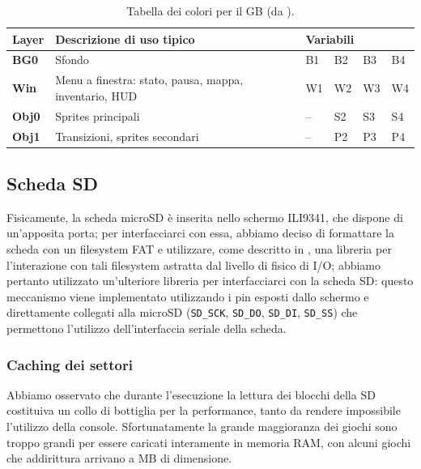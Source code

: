 \documentclass[hidelinks,12pt]{article}
\begin{document}
\begin{table}[h]
	\begin{tabular}{|l|l|llll|}
		\hline
		\textbf{Layer} & \textbf{Descrizione di uso tipico}                    & \multicolumn{4}{l|}{\textbf{Variabili}}                                                          \\ \hline
		\textbf{BG0}   & Sfondo                                                & \multicolumn{1}{l|}{B1}                 & \multicolumn{1}{l|}{B2} & \multicolumn{1}{l|}{B3} & B4 \\ \hline
		\textbf{Win}   & Menu a finestra: stato, pausa, mappa, inventario, HUD & \multicolumn{1}{l|}{W1}                 & \multicolumn{1}{l|}{W2} & \multicolumn{1}{l|}{W3} & W4 \\ \hline
		\textbf{Obj0}  & Sprites principali                                    & \multicolumn{1}{l|}{–}                  & \multicolumn{1}{l|}{S2} & \multicolumn{1}{l|}{S3} & S4 \\ \hline
		\textbf{Obj1}  & Transizioni, sprites secondari                        & \multicolumn{1}{l|}{–}                  & \multicolumn{1}{l|}{P2} & \multicolumn{1}{l|}{P3} & P4 \\ \hline
	\end{tabular}
	\caption{Tabella dei colori per il GB (da
		\cite{GameBoyColors}).}
	\label{table:gb_colors}
\end{table}

\subsection{Scheda SD}
Fisicamente, la scheda microSD è inserita nello schermo ILI9341, che dispone di
un'apposita porta; per interfacciarci con essa, abbiamo deciso di formattare la
scheda con un filesystem FAT e utilizzare, come descritto in \cite{stm1721}, una
libreria per l'interazione con tali filesystem astratta dal livello di fisico di
I/O; abbiamo pertanto utilizzato un'ulteriore libreria per interfacciarci con
la scheda SD: questo meccanismo viene implementato utilizzando i pin esposti
dallo schermo e direttamente collegati alla microSD (\texttt{SD\_SCK},
\texttt{SD\_DO}, \texttt{SD\_DI}, \texttt{SD\_SS}) che permettono l'utilizzo
dell'interfaccia seriale della scheda.

\subsubsection{Caching dei settori}
Abbiamo osservato che durante l'esecuzione la lettura dei blocchi della SD
costituiva un collo di bottiglia per la performance, tanto da rendere
impossibile l'utilizzo della console. Sfortunatamente la grande maggioranza
dei giochi sono troppo grandi per essere caricati interamente in memoria RAM,
con alcuni giochi che addirittura arrivano a MB di dimensione.
\end{document}
